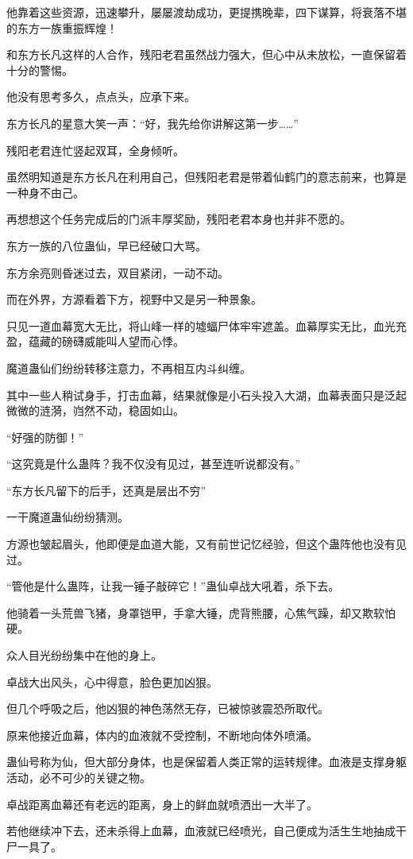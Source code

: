 \begin{this_body}
他靠着这些资源，迅速攀升，屡屡渡劫成功，更提携晚辈，四下谋算，将衰落不堪的东方一族重振辉煌！

和东方长凡这样的人合作，残阳老君虽然战力强大，但心中从未放松，一直保留着十分的警惕。

他没有思考多久，点点头，应承下来。

东方长凡的星意大笑一声：“好，我先给你讲解这第一步……”

残阳老君连忙竖起双耳，全身倾听。

虽然明知道是东方长凡在利用自己，但残阳老君是带着仙鹤门的意志前来，也算是一种身不由己。

再想想这个任务完成后的门派丰厚奖励，残阳老君本身也并非不愿的。

东方一族的八位蛊仙，早已经破口大骂。

东方余亮则昏迷过去，双目紧闭，一动不动。

而在外界，方源看着下方，视野中又是另一种景象。

只见一道血幕宽大无比，将山峰一样的墟蝠尸体牢牢遮盖。血幕厚实无比，血光充盈，蕴藏的磅礴威能叫人望而心悸。

魔道蛊仙们纷纷转移注意力，不再相互内斗纠缠。

其中一些人稍试身手，打击血幕，结果就像是小石头投入大湖，血幕表面只是泛起微微的涟漪，岿然不动，稳固如山。

“好强的防御！”

“这究竟是什么蛊阵？我不仅没有见过，甚至连听说都没有。”

“东方长凡留下的后手，还真是层出不穷”

一干魔道蛊仙纷纷猜测。

方源也皱起眉头，他即便是血道大能，又有前世记忆经验，但这个蛊阵他也没有见过。

“管他是什么蛊阵，让我一锤子敲碎它！”蛊仙卓战大吼着，杀下去。

他骑着一头荒兽飞猪，身罩铠甲，手拿大锤，虎背熊腰，心焦气躁，却又欺软怕硬。

众人目光纷纷集中在他的身上。

卓战大出风头，心中得意，脸色更加凶狠。

但几个呼吸之后，他凶狠的神色荡然无存，已被惊骇震恐所取代。

原来他接近血幕，体内的血液就不受控制，不断地向体外喷涌。

蛊仙号称为仙，但大部分身体，也是保留着人类正常的运转规律。血液是支撑身躯活动，必不可少的关键之物。

卓战距离血幕还有老远的距离，身上的鲜血就喷洒出一大半了。

若他继续冲下去，还未杀得上血幕，血液就已经喷光，自己便成为活生生地抽成干尸一具了。


\end{this_body}
